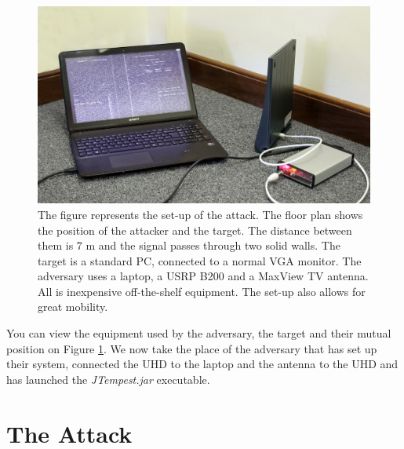 \documentclass[a4paper,12pt,twoside,openright]{report}
\begin{document}
\begin{figure}[p]
\begin{minipage}[c][9cm][t]{.45\textwidth}
  \label{fig:test2}\par\vfill
  \includegraphics[width=\textwidth]{demo_adversary}
\end{minipage}
\caption{The figure represents the set-up of the attack. The floor plan shows the position of the attacker and the target. The distance between them is $7$ m and the signal passes through two solid walls. The target is a standard PC, connected to a normal VGA monitor. The adversary uses a laptop, a USRP B200 and a MaxView TV antenna. All is inexpensive off-the-shelf equipment. The set-up also allows for great mobility. }
\label{fig:practicalattack}
\end{figure}

You can view the equipment used by the adversary, the target and their mutual position on Figure \ref{fig:practicalattack}. We now take the place of the adversary that has set up their system, connected the UHD to the laptop and the antenna to the UHD and has launched the \textit{JTempest.jar} executable.

\section{The Attack}
\end{document}
